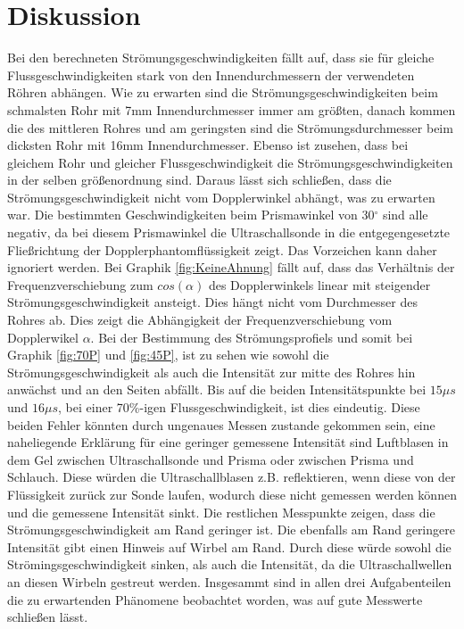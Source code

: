 \section{Diskussion}
\label{sec:Diskussion}

Bei den berechneten Strömungsgeschwindigkeiten fällt auf, dass sie für gleiche Flussgeschwindigkeiten stark von den Innendurchmessern der 
verwendeten Röhren abhängen. Wie zu erwarten sind die Strömungsgeschwindigkeiten beim schmalsten Rohr mit 7mm Innendurchmesser immer am größten, 
danach kommen die des mittleren Rohres und am geringsten sind die Strömungsdurchmesser beim dicksten Rohr mit 16mm Innendurchmesser.
Ebenso ist zusehen, dass bei gleichem Rohr und gleicher Flussgeschwindigkeit die Strömungsgeschwindigkeiten in der selben größenordnung sind. 
Daraus lässt sich schließen, dass die Strömungsgeschwindigkeit nicht vom Dopplerwinkel abhängt, was zu erwarten war. Die bestimmten Geschwindigkeiten 
beim Prismawinkel von 30$^{\circ}$ sind alle negativ, da bei diesem Prismawinkel die Ultraschallsonde in die entgegengesetzte Fließrichtung 
der Dopplerphantomflüssigkeit zeigt. Das Vorzeichen kann daher ignoriert werden. 
Bei Graphik \ref{fig:KeineAhnung} fällt auf, dass das Verhältnis der Frequenzverschiebung zum $cos(\alpha)$ des Dopplerwinkels linear mit steigender 
Strömungsgeschwindigkeit ansteigt. Dies hängt nicht vom Durchmesser des Rohres ab. Dies zeigt die Abhängigkeit der Frequenzverschiebung vom 
Dopplerwikel $\alpha$. 
Bei der Bestimmung des Strömungsprofiels und somit bei Graphik \ref{fig:70P} und \ref{fig:45P}, ist zu sehen wie sowohl die Strömungsgeschwindigkeit als auch 
die Intensität zur mitte des Rohres hin anwächst und an den Seiten abfällt. Bis auf die beiden Intensitätspunkte bei $15\mu s$ und $16\mu s$, bei 
einer 70\%-igen Flussgeschwindigkeit, ist dies eindeutig. Diese beiden Fehler könnten durch ungenaues Messen zustande gekommen sein, eine 
naheliegende Erklärung für eine geringer gemessene Intensität sind Luftblasen in dem Gel zwischen Ultraschallsonde und Prisma oder 
zwischen Prisma und Schlauch. Diese würden die Ultraschallblasen z.B. reflektieren, wenn diese von der Flüssigkeit zurück zur Sonde laufen, 
wodurch diese nicht gemessen werden können und die gemessene Intensität sinkt.
Die restlichen Messpunkte zeigen, dass die Strömungsgeschwindigkeit am Rand geringer ist. Die ebenfalls am Rand geringere Intensität 
gibt einen Hinweis auf Wirbel am Rand. Durch diese würde sowohl die Strömingsgeschwindigkeit sinken, als auch die Intensität, da 
die Ultraschallwellen an diesen Wirbeln gestreut werden. 
Insgesammt sind in allen drei Aufgabenteilen die zu erwartenden Phänomene beobachtet worden, was auf gute Messwerte schließen lässt.